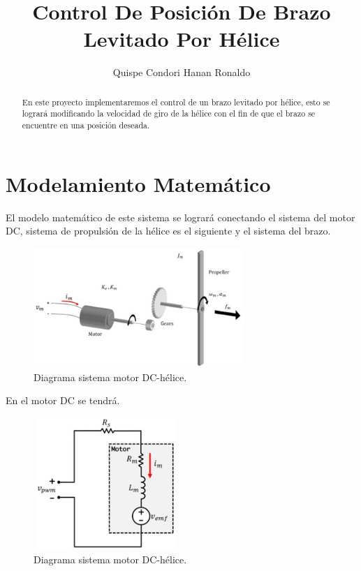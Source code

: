\documentclass[a4paper]{IEEEtran} %
\begin{document}
\title{Control De Posición De Brazo Levitado Por Hélice}
\author{Quispe Condori Hanan Ronaldo}
\maketitle
\begin{abstract}
En este proyecto implementaremos el control de un brazo levitado por hélice, esto se logrará modificando la velocidad de giro de la hélice con el fin de que el brazo se encuentre en una posición deseada.
\end{abstract}

\section{Modelamiento Matemático}
\label{sec:modelamiento}

El modelo matemático de este sistema se logrará conectando el sistema del motor DC, sistema de propulsión de la hélice es el siguiente y el sistema del brazo. 

\begin{figure}[h]
    \centering
        \includegraphics[width=8cm]{images/3}
        \caption{Diagrama sistema motor DC-hélice.}
        \label{fig:sistema_electrico}
\end{figure}

En el motor DC se tendrá.

\begin{figure}[h]
    \centering
        \includegraphics[width=5.5cm ,height=5cm]{images/2}
        \caption{Diagrama sistema motor DC-hélice.}
        \label{fig:motor DC}
\end{figure}
\end{document}
